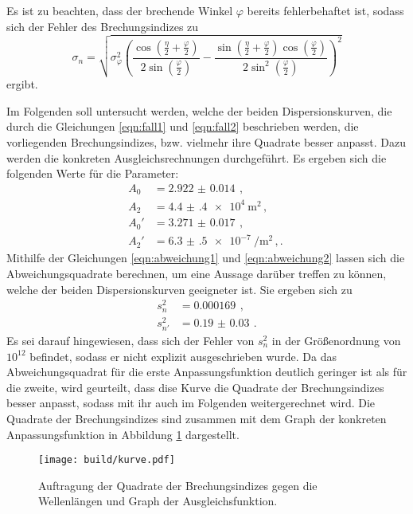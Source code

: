 Es ist zu beachten, dass
der brechende Winkel $\varphi$ bereits fehlerbehaftet ist, sodass sich der Fehler
des Brechungsindizes zu
\begin{equation*}
  \sigma_n = \sqrt{
   \sigma_{\varphi}^{2} \left(\frac{\cos{\left (\frac{\eta}{2} + \frac{\varphi}{2} \right )}}{2 \sin{\left (\frac{\varphi}{2} \right )}} - \frac{\sin{\left (\frac{\eta}{2}
  + \frac{\varphi}{2} \right )} \cos{\left (\frac{\varphi}{2} \right )}}{2 \sin^{2}{\left (\frac{\varphi}{2} \right )}}\right)^{2}}
\end{equation*}
ergibt.

Im Folgenden soll untersucht werden, welche der beiden Dispersionskurven, die durch die
Gleichungen \eqref{eqn:fall1} und \eqref{eqn:fall2} beschrieben werden, die vorliegenden
Brechungsindizes, bzw. vielmehr ihre Quadrate besser anpasst. Dazu werden die konkreten
Ausgleichsrechnungen durchgeführt. Es ergeben sich die folgenden Werte für die Parameter:
\begin{align*}
  A_0 &= \SI{2.922(14)}{}\,,\\
  A_2 &= \SI{4.4(4)e4}{\meter\squared}\,,\\
  A_0' &= \SI{3.271(17)}{}\,,\\
  A_2' &= \SI{6.3(5)e-7}{\per\meter\squared}\,,.\
\end{align*}
Mithilfe der Gleichungen \eqref{eqn:abweichung1} und \eqref{eqn:abweichung2} lassen sich die Abweichungsquadrate
berechnen, um eine Aussage darüber treffen zu können, welche der beiden Dispersionskurven
geeigneter ist. Sie ergeben sich zu
\begin{align*}
  s_n^2 &= \SI{0.000169}{}\,,\\
  s_{n'}^2 &= \SI{0.19(3)}{}\,.
\end{align*}
Es sei darauf hingewiesen, dass sich der Fehler von $s_n^2$ in der Größenordnung
von $10^{12}$ befindet, sodass er nicht explizit ausgeschrieben wurde.
Da das Abweichungsquadrat für die erste Anpassungsfunktion deutlich geringer ist als für
die zweite, wird geurteilt, dass dise Kurve die Quadrate der Brechungsindizes besser anpasst,
sodass mit ihr auch im Folgenden weitergerechnet wird.
Die Quadrate der Brechungsindizes sind zusammen mit dem Graph der konkreten Anpassungsfunktion
in Abbildung \ref{fig:kurve} dargestellt.

\begin{figure}
  \centering
  \texttt{[image: build/kurve.pdf]}
  \caption{Auftragung der Quadrate der Brechungsindizes gegen die Wellenlängen und Graph der Ausgleichsfunktion.}
  \label{fig:kurve}
\end{figure}

